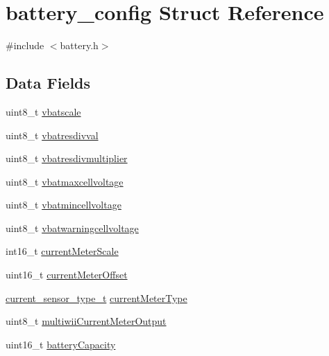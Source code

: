 \hypertarget{structbattery__config}{\section{battery\+\_\+config Struct Reference}
\label{structbattery__config}
}


{\ttfamily \#include $<$battery.\+h$>$}

\subsection*{Data Fields}
\begin{DoxyCompactItemize}
\item 
uint8\+\_\+t \hyperlink{structbattery__config_a441f91ab82da0517bfc54d4d875e2628}{vbatscale}
\item 
uint8\+\_\+t \hyperlink{structbattery__config_aa4f653cc090c38155df8fc7a9ea1c3fe}{vbatresdivval}
\item 
uint8\+\_\+t \hyperlink{structbattery__config_abf78c731ecae3d53c9065ae200899bcf}{vbatresdivmultiplier}
\item 
uint8\+\_\+t \hyperlink{structbattery__config_a3038285727ad88e2486d7c3dc81efde4}{vbatmaxcellvoltage}
\item 
uint8\+\_\+t \hyperlink{structbattery__config_acb35221038a408161aa224b76533f3ca}{vbatmincellvoltage}
\item 
uint8\+\_\+t \hyperlink{structbattery__config_aa0caa88312f033e9f5bc6d904fb62712}{vbatwarningcellvoltage}
\item 
int16\+\_\+t \hyperlink{structbattery__config_adf5b0a02c056b6725000dd1da702383d}{current\+Meter\+Scale}
\item 
uint16\+\_\+t \hyperlink{structbattery__config_acae6bbc9a4217a088082014888766c52}{current\+Meter\+Offset}
\item 
\hyperlink{config_2battery_8h_a387ff84df47a674a3e04d2d3f8d8f310}{current\+\_\+sensor\+\_\+type\+\_\+t} \hyperlink{structbattery__config_a2a1ed071e297d9122a2499c2edef329b}{current\+Meter\+Type}
\item 
uint8\+\_\+t \hyperlink{structbattery__config_a98c4c541598ac7ef2aa445a2e99e1f35}{multiwii\+Current\+Meter\+Output}
\item 
uint16\+\_\+t \hyperlink{structbattery__config_a80ff3b41947dd4ae40c2ac105080ee44}{battery\+Capacity}
\end{DoxyCompactItemize}


